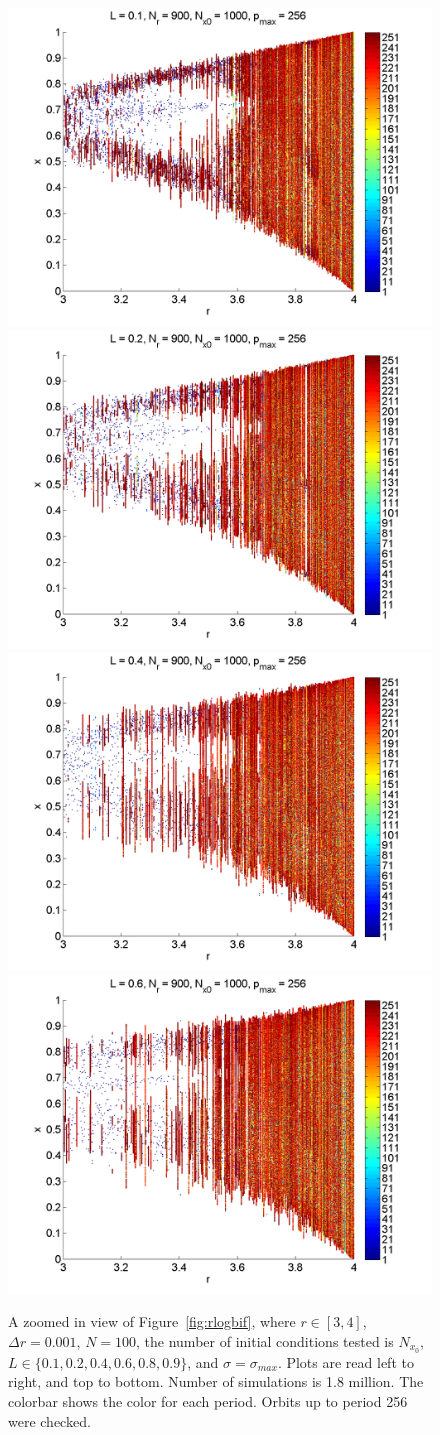 \begin{figure}[H]\linespread{1}
\caption[Bifurcation diagram of the random logistic map, $\sigma=\sigma_{max}$, zoomed
in]{A zoomed in view of Figure~\ref{fig:rlogbif}, where $r \in
  [3,4]$, $\Delta r = 0.001$, $N=100$, the number of initial
  conditions tested is $N_{x_0}$, $L\in \{0.1,0.2,0.4,0.6,0.8,0.9\}$,
  and $\sigma=\sigma_{max}$. Plots are read left to right, and top to
bottom. Number of simulations is 1.8 million. The colorbar shows the color for each period. Orbits up to period 256 were checked.}\label{fig:rlogbif_zoom}
	\begin{center}
		\includegraphics[width=.5\textwidth]{figs/rlog_bif_zoom_L_01.png}\hfill
		\includegraphics[width=.5\textwidth]{figs/rlog_bif_zoom_L_02.png}\\
		\includegraphics[width=.5\textwidth]{figs/rlog_bif_zoom_L_04.png}\hfill
		\includegraphics[width=.5\textwidth]{figs/rlog_bif_zoom_L_06.png}\\

\end{center}
\end{figure}
